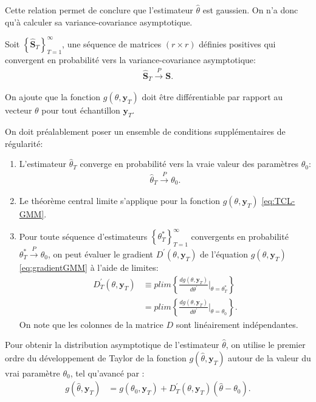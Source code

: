 Cette relation permet de conclure que l'estimateur $\hat\theta$ est
gaussien. On n'a donc qu'à calculer sa variance-covariance
asymptotique.

Soit $\left\{\mathbf{\hat{S}}_T \right\}_{T=1}^{\infty}$, une séquence
de matrices $(r \times r)$ définies positives qui convergent en
probabilité vers la variance-covariance asymptotique:
\begin{align*}
  \mathbf{\hat{S}}_T \stackrel{P}{\longrightarrow} \mathbf{S}.
\end{align*}

On ajoute que la fonction $g(\theta,\mathbf{y}_{T})$ doit être
différentiable par rapport au vecteur $\theta$ pour tout échantillon
$\mathbf{y}_{T}$.

On doit préalablement poser un ensemble de conditions supplémentaires
de régularité:
\begin{enumerate}
\item L'estimateur $\hat\theta_T$ converge en probabilité vers la
  vraie valeur des paramètres $\theta_0$:
  \begin{align}
    \label{eq:varasympt.1}
    \hat\theta_T \stackrel{P}{\longrightarrow} \theta_0.
  \end{align}
\item Le théorème central limite s'applique pour la fonction
  $g(\theta,\mathbf{y}_{T})$ \eqref{eq:TCL-GMM}.
\item Pour toute séquence d'estimateurs $\left\{ \theta_T^{*}
  \right\}_{T=1}^{\infty}$ convergents en probabilité $\theta_T^{*}
  \stackrel{P}{\longrightarrow} \theta_0$, on peut évaluer le gradient
  $D^{\prime}(\theta,\mathbf{y}_{T})$ de l'équation
  $g(\theta,\mathbf{y}_{T})$ \eqref{eq:gradientGMM} à l'aide de
  limites:
  \begin{align}
    \label{eq:varasympt.3}
    D^{\prime}_T(\theta,\mathbf{y}_{T}) &\equiv plim \left\{\frac{dg(\theta,\mathbf{y}_{T})}{d\theta^{\prime}}|_{\theta=\theta_T^{*}} \right\} \nonumber\\
    &= plim
    \left\{\frac{dg(\theta,\mathbf{y}_{T})}{d\theta^{\prime}}|_{\theta=\theta_0}
    \right\}.
  \end{align}
  On note que les colonnes de la matrice $D$ sont linéairement
  indépendantes.
\end{enumerate}

Pour obtenir la distribution asymptotique de l'estimateur
$\hat\theta$, on utilise le premier ordre du développement de Taylor
de la fonction $g(\hat\theta,\mathbf{y}_{T})$ autour de la valeur du
vrai paramètre $\theta_0$, tel qu'avancé par
\cite{gourieroux1989statistique}:
\begin{align}
  \label{eq:taylorfonction.g}
  g(\hat\theta,\mathbf{y}_{T}) &= g(\theta_0,\mathbf{y}_{T}) +
  D^{\prime}_T(\theta,\mathbf{y}_{T}) \left(\hat\theta-\theta_0
  \right).
\end{align}

